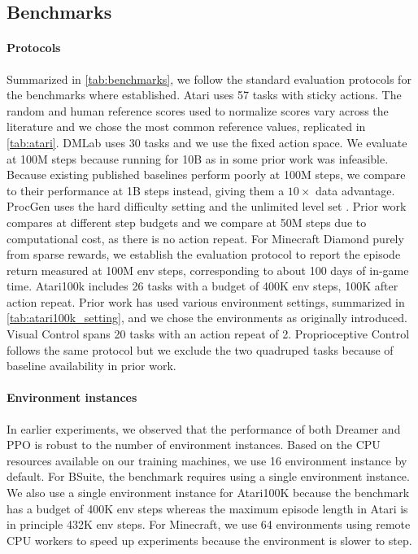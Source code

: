 \clearpage
\vspace*{-3\baselineskip}
\subsection*{Benchmarks}

\paragraph{Protocols}
Summarized in \cref{tab:benchmarks}, we follow the standard evaluation protocols for the benchmarks where established.
Atari \citep{bellemare2013ale} uses 57 tasks with sticky actions\citep{machado2018stickyactions}. The random and human reference scores used to normalize scores vary across the literature and we chose the most common reference values, replicated in \cref{tab:atari}.
DMLab\citep{beattie2016dmlab} uses 30 tasks\citep{espeholt2018impala} and we use the fixed action space\citep{hessel2019popart,kapturowski2018r2d2}. We evaluate at 100M steps because running for 10B as in some prior work was infeasible. Because existing published baselines perform poorly at 100M steps, we compare to their performance at 1B steps instead, giving them a $10\times$ data advantage.
ProcGen uses the hard difficulty setting and the unlimited level set \citep{cobbe2020procgen}. Prior work compares at different step budgets\citep{cobbe2020procgen,cobbe2021ppg} and we compare at 50M steps due to computational cost, as there is no action repeat.
For Minecraft Diamond purely from sparse rewards, we establish the evaluation protocol to report the episode return measured at 100M env steps, corresponding to about 100 days of in-game time.
Atari100k\citep{kaiser2019simple} includes 26 tasks with a budget of 400K env steps, 100K after action repeat. Prior work has used various environment settings, summarized in \cref{tab:atari100k_setting}, and we chose the environments as originally introduced.
Visual Control\citep{tassa2018dmcontrol,hafner2019dreamer} spans 20 tasks with an action repeat of 2.
Proprioceptive Control follows the same protocol but we exclude the two quadruped tasks because of baseline availability in prior work\citep{yarats2021drqv2}.



\paragraph{Environment instances}
In earlier experiments, we observed that the performance of both Dreamer and PPO is robust to the number of environment instances. Based on the CPU resources available on our training machines, we use 16 environment instance by default. For BSuite, the benchmark requires using a single environment instance. We also use a single environment instance for Atari100K because the benchmark has a budget of 400K env steps whereas the maximum episode length in Atari is in principle 432K env steps. For Minecraft, we use 64 environments using remote CPU workers to speed up experiments because the environment is slower to step.

